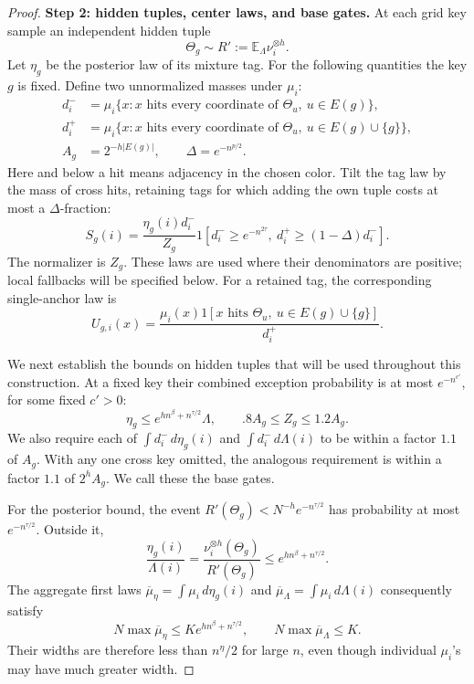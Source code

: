 \begin{proof}
\noindent\textbf{Step 2: hidden tuples, center laws, and base gates.}\quad
At each grid key sample an independent hidden tuple
\[
 \Theta_g\sim R':=\mathbb E_\Lambda\nu_i^{\otimes h}.
\]
Let \(\eta_g\) be the posterior law of its mixture tag. For the following quantities the key \(g\) is fixed. Define two unnormalized masses under \(\mu_i\):
\[
 \begin{aligned}
 d_i^-&=\mu_i\{x:x\text{ hits every coordinate of }\Theta_u,\
                                     u\in E(g)\},\\
 d_i^+&=\mu_i\{x:x\text{ hits every coordinate of }\Theta_u,\
                                     u\in E(g)\cup\{g\}\},\\
 A_g&=2^{-h|E(g)|},\qquad \Delta=e^{-n^{p/2}}.
 \end{aligned}
\]
Here and below a hit means adjacency in the chosen color. Tilt the tag law by the mass of cross hits, retaining tags for which adding the own tuple costs at most a \(\Delta\)-fraction:
\[
 S_g(i)=\frac{\eta_g(i)d_i^-}{Z_g}
       1[d_i^-\ge e^{-n^{2\tau}},\
                         d_i^+\ge(1-\Delta)d_i^-].
\]
The normalizer is \(Z_g\). These laws are used where their denominators are positive; local fallbacks will be specified below. For a retained tag, the corresponding single-anchor law is
\[
 U_{g,i}(x)=
 \frac{\mu_i(x)1[x\text{ hits }\Theta_u,\
                         u\in E(g)\cup\{g\}]}{d_i^+}.
\]

We next establish the bounds on hidden tuples that will be used throughout this construction. At a fixed key their combined exception probability is at most \(e^{-n^{c'}}\), for some fixed \(c'>0\):
\[
 \eta_g\le e^{h n^\beta+n^{\tau/2}}\Lambda,
 \qquad .8A_g\le Z_g\le1.2A_g.
\]
We also require each of \(\int d_i^-\,d\eta_g(i)\) and \(\int d_i^-\,d\Lambda(i)\) to be within a factor \(1.1\) of \(A_g\). With any one cross key omitted, the analogous requirement is within a factor \(1.1\) of \(2^hA_g\). We call these the base gates.

For the posterior bound, the event
\(R'(\Theta_g)<N^{-h}e^{-n^{\tau/2}}\) has probability at most \(e^{-n^{\tau/2}}\). Outside it,
\[
 \frac{\eta_g(i)}{\Lambda(i)}
 =\frac{\nu_i^{\otimes h}(\Theta_g)}{R'(\Theta_g)}
 \le e^{h n^\beta+n^{\tau/2}}.
\]
The aggregate first laws
\(\overline\mu_\eta=\int\mu_i\,d\eta_g(i)\) and
\(\overline\mu_\Lambda=\int\mu_i\,d\Lambda(i)\) consequently satisfy
\[
 N\max\overline\mu_\eta\le K e^{h n^\beta+n^{\tau/2}},
 \qquad N\max\overline\mu_\Lambda\le K.
\]
Their widths are therefore less than \(n^\eta/2\) for large \(n\), even though individual \(\mu_i\)'s may have much greater width.


\end{proof}
